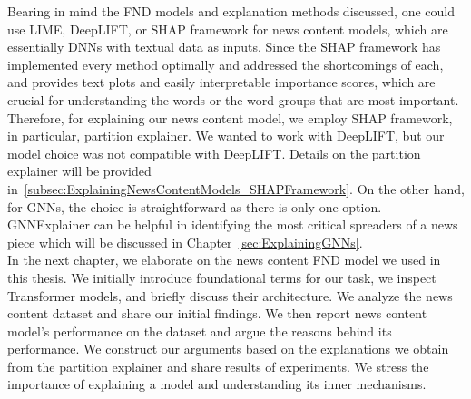 Bearing in mind the FND models and explanation methods discussed, one could use LIME, DeepLIFT, or SHAP framework for news content models, which are essentially DNNs with textual data as inputs. Since the SHAP framework has implemented every method optimally and addressed the shortcomings of each, and provides text plots and easily interpretable importance scores, which are crucial for understanding the words or the word groups that are most important. Therefore, for explaining our news content model, we employ SHAP framework, in particular, partition explainer. We wanted to work with DeepLIFT, but our model choice was not compatible with DeepLIFT. Details on the partition explainer will be provided in~\ref{subsec:ExplainingNewsContentModels_SHAPFramework}. On the other hand, for GNNs, the choice is straightforward as there is only one option. GNNExplainer can be helpful in identifying the most critical spreaders of a news piece which will be discussed in Chapter~\ref{sec:ExplainingGNNs}.\\
In the next chapter, we elaborate on the news content FND model we used in this thesis. We initially introduce foundational terms for our task, we inspect Transformer models, and briefly discuss their architecture. We analyze the news content dataset and share our initial findings. We then report news content model's performance on the dataset and argue the reasons behind its performance. We construct our arguments based on the explanations we obtain from the partition explainer and share results of experiments. We stress the importance of explaining a model and understanding its inner mechanisms.
